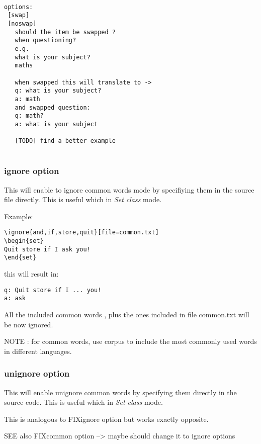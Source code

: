 \documentclass[a4paper,11pt]{article}
\begin{document}
\begin{verbatim}

options:
 [swap]
 [noswap]
   should the item be swapped ?
   when questioning?
   e.g.
   what is your subject?
   maths

   when swapped this will translate to ->
   q: what is your subject?
   a: math
   and swapped question:
   q: math?
   a: what is your subject

   [TODO] find a better example


\end{verbatim}



\subsubsection{ignore option}
This will enable to ignore common words mode by specifiying them in
the source file directly. This is useful which in \emph{Set class} mode.

Example:
\begin{verbatim}
\ignore{and,if,store,quit}[file=common.txt]
\begin{set}
Quit store if I ask you!
\end{set}
\end{verbatim}

this will result in:
\begin{verbatim}
q: Quit store if I ... you!
a: ask
\end{verbatim}

All the included common words , plus the ones included in file common.txt will
be now ignored.

NOTE : for common words, use corpus to include the most commonly used words in
different languages.



\subsubsection{unignore option}
This will enable unignore common words by specifying them directly in the
source code. This is useful which in \emph{Set class} mode.

This is analogous to FIXignore option but works exactly opposite.

SEE also FIXcommon option --> maybe should change it to ignore options

\end{document}
